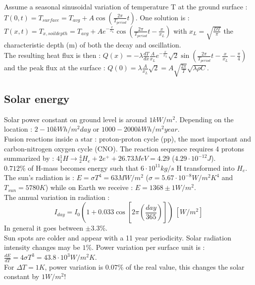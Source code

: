 \documentclass[../main.tex]{subfiles}
\begin{document}
Assume a seasonal sinusoidal variation of temperature T at the ground surface : $T(0,t) = T_{surface} = T_{avg} + A\cos(\frac{2\pi}{T_{period}}t)$. One solution is : $T(x,t) = T_{x,soil depth} = T_{avg} + Ae^{-\frac{x}{x_L}}\cos(\frac{2\pi}{T_{period}} t - \frac{x}{x_L})$ with $x_L = \sqrt{\frac{DT}{\pi}}$ the characteristic depth (m) of both the decay and oscillation. \\
The resulting heat flux is then : $Q(x) = -\lambda \frac{dT}{dx} \frac{A}{x_L} e^{-\frac{x}{x_L}} \sqrt{2} \sin(\frac{2\pi}{T_{period}}t - \frac{x}{x_L} - \frac{\pi}{4})$ and the peak flux at the surface : $Q(0) = \lambda \frac{A}{x_L}\sqrt{2} = A\sqrt{\frac{2\pi}{T}} \sqrt{\lambda \rho C}$.\\


\subsection{Solar energy}
Solar power constant on ground level is around $1kW/m^2$. Depending on the location : $2-10kWh/m^2day$ or $1000-2000 kWh/m^2 year$.\\

Fusion reactions inside a star : proton-proton cycle (pp), the most important and carbon-nitrogen oxygen cycle (CNO). The reaction sequence requires 4 protons summarized by : $4 {}_1^1H \rightarrow {}_2^4 H_e + 2e^+ + 26.73MeV = 4.29$ ($4.29\cdot 10^{-12}J$).\\
$0.712\%$ of H-mass becomes energy such that $6\cdot 10^{11} kg/s$ H transformed into $H_e$.\\
The sun's radiation is : $E= \sigma T^4 = 63 MW/m^2$ ($\sigma = 5.67 \cdot 10^{-8} W/m^2K^4$ and $T_{sun} = 5780K$) while on Earth we receive : $E = 1368 \pm 1W/m^2$.\\
The annual variation in radiation : \begin{equation}
    I_{day} = I_0 (1+0.033 \cos[2\pi (\frac{day}{365})]) \: [W/m^2]
\end{equation}
In general it goes between $\pm 3.3\%$.\\

Sun spots are colder and appear with a 11 year periodicity. Solar radiation intensity changes may be $1\%$. Power variation per surface unit is : $\frac{dE}{dT} = 4\sigma T^3 = 43.8\cdot 10^3 W/m^2K$.\\
For $\Delta T=1K$, power variation is $0.07\%$ of the real value, this changes the solar constant by $1W/m^2$!\\
\end{document}
